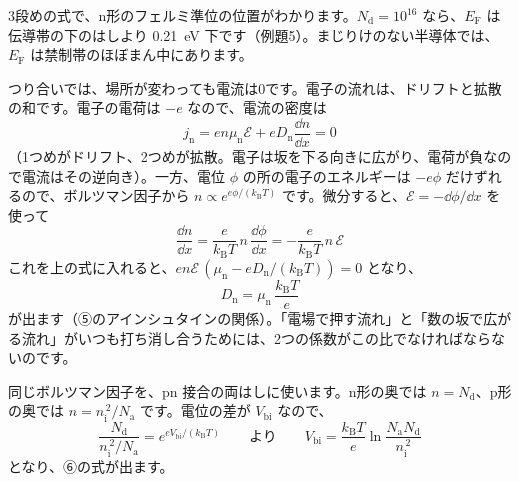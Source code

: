 \begin{phflow}
\end{phflow}

\noindent 3段めの式で、n形のフェルミ準位の位置がわかります。$N_{\mathrm d}=10^{16}$ なら、$E_{\mathrm F}$ は伝導帯の下のはしより \qty{0.21}{eV} 下です（例題5）。まじりけのない半導体では、$E_{\mathrm F}$ は禁制帯のほぼまん中にあります。

つり合いでは、場所が変わっても電流は0です。電子の流れは、ドリフトと拡散の和です。電子の電荷は $-e$ なので、電流の密度は
\[ j_{\mathrm n}=en\mu_{\mathrm n}\mathcal E+eD_{\mathrm n}\frac{\dd n}{\dd x}=0 \]
（1つめがドリフト、2つめが拡散。電子は坂を下る向きに広がり、電荷が負なので電流はその逆向き）。一方、電位 $\phi$ の所の電子のエネルギーは $-e\phi$ だけずれるので、ボルツマン因子から $n\propto e^{e\phi/(k_{\mathrm B}T)}$ です。微分すると、$\mathcal E=-\dd\phi/\dd x$ を使って
\[ \frac{\dd n}{\dd x}=\frac{e}{k_{\mathrm B}T}\,n\,\frac{\dd\phi}{\dd x}=-\frac{e}{k_{\mathrm B}T}\,n\,\mathcal E \]
これを上の式に入れると、$en\mathcal E\,(\mu_{\mathrm n}-eD_{\mathrm n}/(k_{\mathrm B}T))=0$ となり、
\[ D_{\mathrm n}=\mu_{\mathrm n}\,\frac{k_{\mathrm B}T}{e} \]
が出ます（⑤のアインシュタインの関係）。「電場で押す流れ」と「数の坂で広がる流れ」がいつも打ち消し合うためには、2つの係数がこの比でなければならないのです。

同じボルツマン因子を、pn 接合の両はしに使います。n形の奥では $n=N_{\mathrm d}$、p形の奥では $n=n_{\mathrm i}^{\,2}/N_{\mathrm a}$ です。電位の差が $V_{\mathrm{bi}}$ なので、
\[ \frac{N_{\mathrm d}}{n_{\mathrm i}^{\,2}/N_{\mathrm a}}=e^{eV_{\mathrm{bi}}/(k_{\mathrm B}T)}\qquad\text{より}\qquad V_{\mathrm{bi}}=\frac{k_{\mathrm B}T}{e}\ln\frac{N_{\mathrm a}N_{\mathrm d}}{n_{\mathrm i}^{\,2}} \]
となり、⑥の式が出ます。

